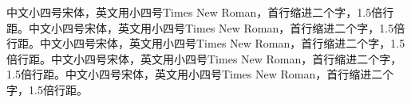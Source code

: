 \xiaosi \song 

中文小四号宋体，英文用小四号Times New  Roman，首行缩进二个字，1.5倍行距。中文小四号宋体，英文用小四号Times New  Roman，首行缩进二个字，1.5倍行距。中文小四号宋体，英文用小四号Times New  Roman，首行缩进二个字，1.5倍行距。中文小四号宋体，英文用小四号Times New  Roman，首行缩进二个字，1.5倍行距。中文小四号宋体，英文用小四号Times New  Roman，首行缩进二个字，1.5倍行距。